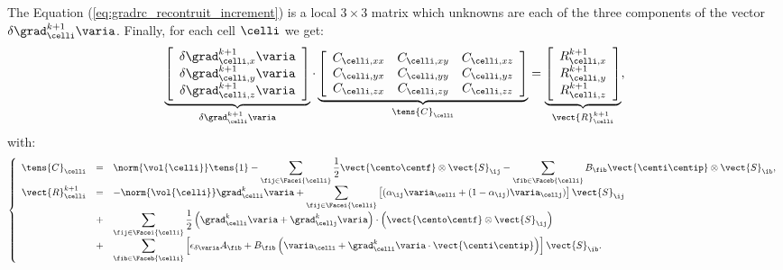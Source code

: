 The Equation (\ref{eq:gradrc_recontruit_increment}) is a local $3 \times 3$ matrix which unknowns are each of the three components of 
the vector $\delta \grad_\celli^{k+1} \varia$. Finally, for each cell $\celli$ we get:
%
\begin{equation}\label{eq:eq_systeme_matriciel_gradrc}
\underbrace{
\left[\begin{array}{c}
\delta \grad_{\celli ,x}^{k+1} \varia\\
\delta \grad_{\celli ,y}^{k+1} \varia\\ 
\delta \grad_{\celli ,z}^{k+1} \varia
\end{array}\right]
}_{\delta \grad_\celli^{k+1} \varia }
\cdot
\underbrace{
\left[\begin{array}{ccc}
\displaystyle
  C_{\celli , xx}
& C_{\celli , xy}
& C_{\celli , xz}\\
\displaystyle
  C_{\celli , yx}
& C_{\celli , yy}
& C_{\celli , yz}\\
\displaystyle
  C_{\celli , zx}
& C_{\celli , zy}
& C_{\celli , zz}
\end{array}\right]
}_{\tens{C}_{\celli}}
=
\underbrace{
\left[\begin{array}{c}
\displaystyle
R^{k+1}_{\celli ,x}\\
\displaystyle
R^{k+1}_{\celli ,y}\\
\displaystyle
R^{k+1}_{\celli ,z}
\end{array}\right]
}_{\vect{R}^{k+1}_{\celli}} , 
\end{equation}
%
with:
%
\begin{equation}\label{eq:eq_second_membre_gradrc}
\left\{\begin{array}{rcl}
\tens{C}_\celli  &=& 
\displaystyle
\norm{\vol{\celli}} \tens{1} - 
\sum\limits_{ \fij \in \Facei{\celli}} \frac{1}{2}  \vect{\cento \centf} \otimes \vect{S}_{\ij} -
\sum\limits_{ \fib \in \Faceb{\celli}} B_{\fib} \vect{\centi \centip}  \otimes \vect{S}_{\ib} ,\\
\vect{R}^{k+1}_{\celli} &=&
\displaystyle 
 -\norm{\vol{\celli}}  \grad_{\celli}^{k} \varia +
\sum\limits_{\fij \in \Facei{\celli}}\left[
(\alpha_{\ij} \varia_\celli + (1 - \alpha_{\ij}) \varia_\cellj)\right] \vect{S}_{\ij} \\
&+& \displaystyle
\sum\limits_{\fij \in \Facei{\celli}} \frac{1}{2} 
\left(\grad_\celli^k \varia + \grad_\cellj^k \varia \right) \cdot \left( \vect{\cento \centf} \otimes \vect{S}_{\ij} \right) \\
&+& \displaystyle 
\sum\limits_{\fib \in \Faceb{\celli}}\left[ \epsilon_{\delta \varia} A_{\fib} 
+ B_{\fib} \left( \varia_\celli + \grad_\celli^k \varia \cdot \vect{\centi \centip} \right)  \right] \vect{S}_{\ib} .
\end{array}\right.
\end{equation}

